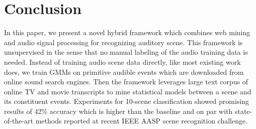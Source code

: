 \section{Conclusion}
\label{sec:conclude}

In this paper, we present a novel hybrid framework which combines web mining 
and audio signal processing for recognizing auditory scene. This framework
is unsupervised in the sense that no manual labeling of the audio training
data is needed. Instead of training audio scene data directly, like most
existing work does, we train GMMs on primitive audible events which are
downloaded from online sound search engines. Then the framework leverages
large text corpus of online TV and movie transcripts to mine statistical
models between a scene and its constituent events. Experiments for
10-scene classification showed promising results of 42\% accuracy which is
higher than the baseline and on par with state-of-the-art methods 
reported at recent
IEEE AASP scene recognition challenge.
%
%


